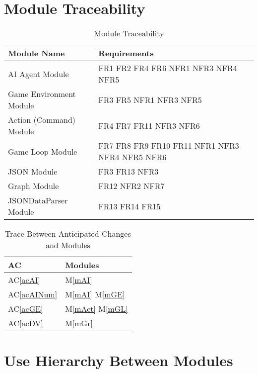 \documentclass[12pt, titlepage]{article}
\newcommand{\acref}[1]{AC\ref{#1}}
\newcommand{\mref}[1]{M\ref{#1}}
\begin{document}
\section{Module Traceability}
\begin{table}[h!]
\centering
\begin{tabular}{p{} p{}}
\toprule
\textbf{Module Name} & \textbf{Requirements}\\
\midrule

\multirow{1}{0.4\textwidth}{AI Agent Module} & FR1 FR2 FR4 FR6 NFR1 NFR3 NFR4 NFR5\\
\multirow{1}{0.4\textwidth}{Game Environment Module} & FR3 FR5 NFR1 NFR3 NFR5\\
\midrule
\multirow{1}{0.4\textwidth}{Action (Command) Module} & FR4 FR7 FR11 NFR3 NFR6\\
\multirow{1}{0.4\textwidth}{Game Loop Module} & FR7 FR8 FR9 FR10 FR11 NFR1 NFR3 NFR4 NFR5 NFR6\\
\midrule

\multirow{1}{0.4\textwidth}{JSON Module} & FR3 FR13 NFR3\\
\multirow{1}{0.4\textwidth}{Graph Module} & FR12 NFR2 NFR7\\
\multirow{1}{0.4\textwidth}{JSONDataParser Module} & FR13 FR14 FR15\\
\bottomrule

\end{tabular}
\caption{Module Traceability}
\label{TblRT}
\end{table}

\begin{table}[H]
\centering
\begin{tabular}{p{} p{}}
\toprule
\textbf{AC} & \textbf{Modules}\\
\midrule
\acref{acAI} & \mref{mAI}\\
\acref{acAINum} & \mref{mAI} \mref{mGE}\\
\acref{acGE} & \mref{mAct} \mref{mGL}\\
\acref{acDV} & \mref{mGr}\\
\bottomrule
\end{tabular}
\caption{Trace Between Anticipated Changes and Modules}
\label{TblACT}
\end{table}

\section{Use Hierarchy Between Modules} \label{SecUse}
\end{document}

